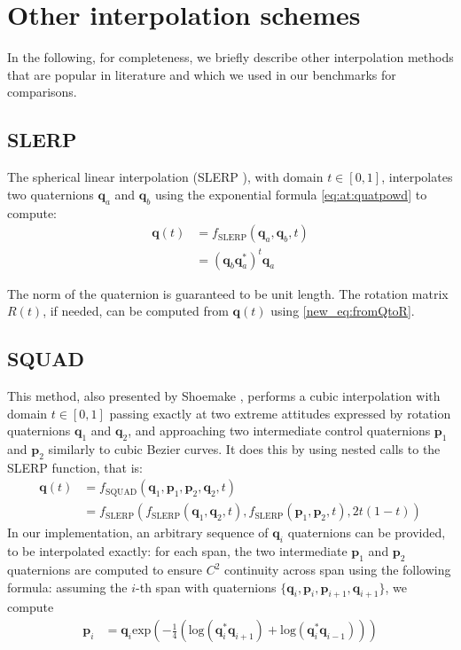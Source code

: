 \documentclass[preprint, 12pt]{elsarticle}
\def\quat#1{{\boldsymbol{#1}}}
\begin{document}
\section{Other interpolation schemes}
\label{app:otherinterpolations}
In the following, for completeness, we briefly describe other interpolation methods that are popular in literature and which we used in our benchmarks for comparisons.

\subsection{SLERP}
The spherical linear interpolation (SLERP \cite{shoemake1985animating}), with domain $t \in [0,1]$, interpolates two quaternions
$\quat{q}_a$ and $\quat{q}_b$ using the exponential formula \eqref{eq:at:quatpowd} to compute:
%
\begin{align}
\label{eq:at:quatrotSLERPa}
 \quat{q}(t) &= f_{\text{SLERP}}(\quat{q}_a,\quat{q}_b,t)  \nonumber \\
 &= \left( \quat{q}_b \quat{q}_a^{*} \right)^t \quat{q}_a
\end{align}

The norm of the quaternion is guaranteed to be unit length. The rotation matrix $R(t)$, if needed, can be computed from $\quat{q}(t)$ using \eqref{new_eq:fromQtoR}.


\subsection{SQUAD}
This method, also presented by Shoemake \cite{Shoemake1987QuaternionCA}, performs a cubic interpolation with domain $t \in [0,1]$ passing exactly at two extreme attitudes expressed by rotation quaternions $\quat{q}_1$ and $\quat{q}_2$, and approaching two intermediate control quaternions $\quat{p}_1$ and $\quat{p}_2$ similarly to cubic Bezier curves. It does this by using nested calls to the SLERP function, that is:
\begin{align}
\label{eq:at:quatrotSQUAD}
 \quat{q}(t) &=  f_{\text{SQUAD}}(\quat{q}_1,\quat{p}_1,\quat{p}_2,\quat{q}_2,t) \nonumber \\
  &= f_{\text{SLERP}}( f_{\text{SLERP}}(\quat{q}_1,\quat{q}_2 ,t),  f_{\text{SLERP}}(\quat{p}_1,\quat{p}_2 ,t), 2 t (1-t) )
\end{align}
In our implementation, an arbitrary sequence of $\quat{q}_i$ quaternions can be provided, to be interpolated exactly: for each span, the two intermediate $\quat{p}_1$ and $\quat{p}_2$ quaternions are computed to ensure $C^2$ continuity across span using the following formula: assuming the $i$-th span with quaternions 
$\{ \quat{q}_i, \quat{p}_i, \quat{p}_{i+1}, \quat{q}_{i+1}\}$, we compute 
\begin{align}
\label{eq:at:quatrotSQUADinner}
 \quat{p}_i &= \quat{q}_i \mathrm{exp} \left( - \frac{1}{4} \left( \mathrm{log}(\quat{q}_i^* \quat{q}_{i+1}) + \mathrm{log}(\quat{q}_i^* \quat{q}_{i-1})  \right)  \right)  
\end{align}
\end{document}
